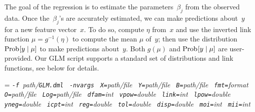 The goal of the regression is to estimate the parameters~$\beta_j$ from the observed
data.  Once the~$\beta_j$'s are accurately estimated, we can make predictions
about~$y$ for a new feature vector~$x$.  To do so, compute $\eta$ from~$x$ and use
the inverted link function $\mu = g^{-1}(\eta)$ to compute the mean $\mu$ of~$y$;
then use the distribution $\mathop{\mathrm{Prob}\hspace{0.5pt}}\nolimits[y\mid \mu]$ to make predictions about~$y$.
Both $g(\mu)$ and $\mathop{\mathrm{Prob}\hspace{0.5pt}}\nolimits[y\mid \mu]$ are user-provided.  Our GLM script supports
a standard set of distributions and link functions, see below for details.

\smallskip
{}
\smallskip

{\hangindent=\parindent\noindent\it%
{\tt{}-f }path/\/{\tt{}GLM.dml}
{\tt{} -nvargs}
{\tt{} X=}path/file
{\tt{} Y=}path/file
{\tt{} B=}path/file
{\tt{} fmt=}format
{\tt{} O=}path/file
{\tt{} Log=}path/file
{\tt{} dfam=}int
{\tt{} vpow=}double
{\tt{} link=}int
{\tt{} lpow=}double
{\tt{} yneg=}double
{\tt{} icpt=}int
{\tt{} reg=}double
{\tt{} tol=}double
{\tt{} disp=}double
{\tt{} moi=}int
{\tt{} mii=}int

}

